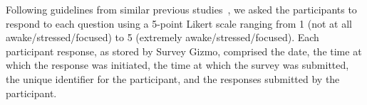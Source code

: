 Following guidelines from similar previous studies~\cite{fogarty05,tanaka11}, we asked the participants to respond to each question using a 5-point Likert scale ranging from 1 (not at all awake/stressed/focused) to 5 (extremely awake/stressed/focused). Each participant response, as stored by Survey Gizmo, comprised the date, the time at which the response was initiated, the time at which the survey was submitted, the unique identifier for the participant, and the responses submitted by the participant.
